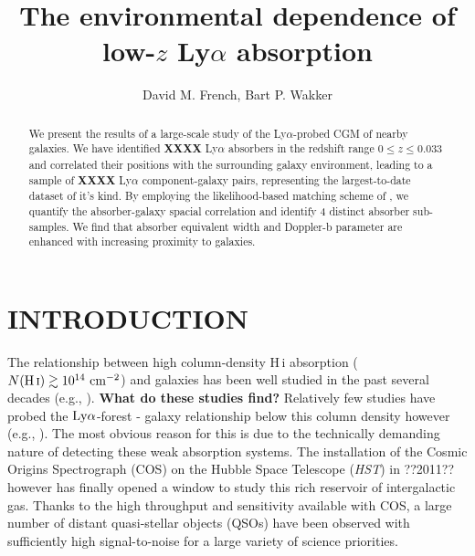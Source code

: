 \documentclass[twocolumn,tighten]{aastex62}
\newcommand{\HI}{\mbox{H\,{\sc i}} }
\begin{document}
\title{The environmental dependence of low-$z$ Ly$\alpha$ absorption}


\author{David M. French, Bart P. Wakker}


\begin{abstract}
We present the results of a large-scale study of the Ly$\alpha$-probed CGM of nearby galaxies. We have identified \textbf{XXXX} Ly$\alpha$ absorbers in the redshift range $0 \leq z \leq 0.033$ and correlated their positions with the surrounding galaxy environment, leading to a sample of \textbf{XXXX} Ly$\alpha$ component-galaxy pairs, representing the largest-to-date dataset of it's kind. By employing the likelihood-based matching scheme of \cite{french2017}, we quantify the absorber-galaxy spacial correlation and identify 4 distinct absorber sub-samples. We find that absorber equivalent width and Doppler-b parameter are enhanced with increasing proximity to galaxies.

\end{abstract}




\section{INTRODUCTION}

The relationship between high column-density \HI absorption ($N(\HI) \gtrsim 10^{14} ~\rm cm^{-2}$) and galaxies has been well studied in the past several decades (e.g., \citealt{lanzetta1995, bowen1996, chen2003, chen2008, rubin2010, rubin2012, steidel2010, prochaska2011b}). \textbf{What do these studies find?} Relatively few studies have probed the $\rm Ly\alpha$-forest - galaxy relationship below this column density however (e.g., \citealt{wakker2009, french2017, bowen2002}). The most obvious reason for this is due to the technically demanding nature of detecting these weak absorption systems. The installation of the Cosmic Origins Spectrograph (COS) on the Hubble Space Telescope (\emph{HST}) in ??2011?? however has finally opened a window to study this rich reservoir of intergalactic gas.  Thanks to the high throughput and sensitivity available with COS, a large number of distant quasi-stellar objects (QSOs) have been observed with sufficiently high signal-to-noise for a large variety of science priorities. 
\end{document}

